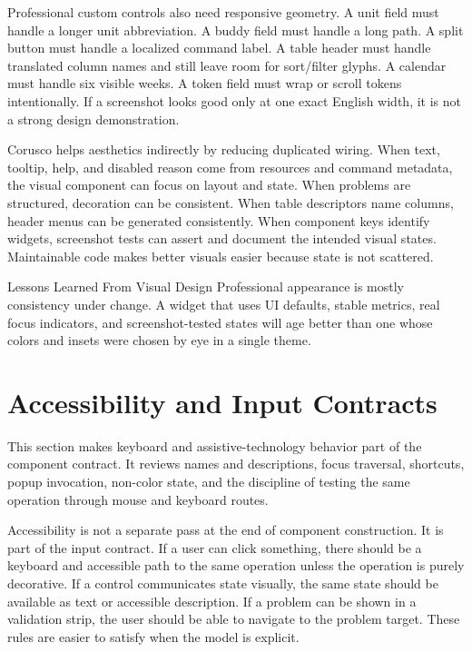 Professional custom controls also need responsive geometry. A unit field must
handle a longer unit abbreviation. A buddy field must handle a long path. A
split button must handle a localized command label. A table header must
handle translated column names and still leave room for sort/filter glyphs.
A calendar must handle six visible weeks. A token field must wrap or scroll
tokens intentionally. If a screenshot looks good only at one exact English
width, it is not a strong design demonstration.

Corusco helps aesthetics indirectly by reducing duplicated wiring. When text,
tooltip, help, and disabled reason come from resources and command metadata,
the visual component can focus on layout and state. When problems are
structured, decoration can be consistent. When table descriptors name columns,
header menus can be generated consistently. When component keys identify
widgets, screenshot tests can assert and document the intended visual states.
Maintainable code makes better visuals easier because state is not scattered.

\begin{principlebox}{Lessons Learned From Visual Design}
Professional appearance is mostly consistency under change. A widget that uses
UI defaults, stable metrics, real focus indicators, and screenshot-tested states
will age better than one whose colors and insets were chosen by eye in a single
theme.
\end{principlebox}

\section{Accessibility and Input Contracts}

\begin{roadmapbox}
This section makes keyboard and assistive-technology behavior part of the
component contract. It reviews names and descriptions, focus traversal,
shortcuts, popup invocation, non-color state, and the discipline of testing the
same operation through mouse and keyboard routes.
\end{roadmapbox}

Accessibility is not a separate pass at the end of component construction. It
is part of the input contract. If a user can click something, there should be
a keyboard and accessible path to the same operation unless the operation is
purely decorative. If a control communicates state visually, the same state
should be available as text or accessible description. If a problem can be
shown in a validation strip, the user should be able to navigate to the
problem target. These rules are easier to satisfy when the model is explicit.

